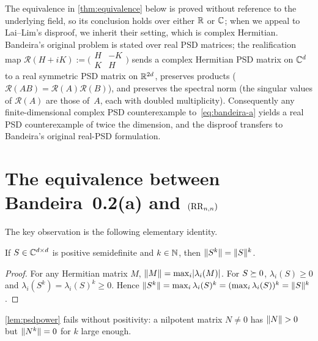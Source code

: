 \begin{remark}\label{rem:realification}
The equivalence in \cref{thm:equivalence} below is proved without
reference to the underlying field, so its conclusion holds over either
$\mathbb{R}$ or $\mathbb{C}$; when we appeal to Lai--Lim's disproof, we inherit their
setting, which is complex Hermitian.  Bandeira's original problem is
stated over real PSD matrices; the realification map
$\mathcal{R}(H+iK) :=
  \bigl(\begin{smallmatrix} H & -K \\ K & H \end{smallmatrix}\bigr)$
sends a complex Hermitian PSD matrix on $\mathbb{C}^d$ to a real symmetric
PSD matrix on $\mathbb{R}^{2d}$, preserves products
($\mathcal{R}(AB)=\mathcal{R}(A)\mathcal{R}(B)$), and preserves the
spectral norm (the singular values of $\mathcal{R}(A)$ are those
of~$A$, each with doubled multiplicity).  Consequently any finite-dimensional
complex PSD counterexample to~\eqref{eq:bandeira-a} yields a real PSD
counterexample of twice the dimension, and the disproof transfers to
Bandeira's original real-PSD formulation.
\end{remark}

\section{The equivalence between Bandeira~0.2(a) and $(\mathrm{RR}_{n,n})$}
\label{sec:equivalence}

The key observation is the following elementary identity.

\begin{lemma}\label{lem:psdpower}
If $S\in\mathbb{C}^{d\times d}$ is positive semidefinite and $k\in\mathbb{N}$, then
$\lVert S^{k}\rVert = \lVert S\rVert^{k}$.
\end{lemma}

\begin{proof}
For any Hermitian matrix $M$,
$\lVert M\rVert=\max_i \lvert\lambda_i(M)\rvert$.
For $S\succeq 0$, $\lambda_i(S)\ge 0$ and
$\lambda_i(S^{k})=\lambda_i(S)^{k}\ge 0$.  Hence
$\lVert S^{k}\rVert
 =\max_i \lambda_i(S)^{k}
 =(\max_i \lambda_i(S))^{k}
 =\lVert S\rVert^{k}$.
\end{proof}

\cref{lem:psdpower} fails without positivity: a nilpotent
matrix $N\ne 0$ has $\lVert N\rVert>0$ but $\lVert N^{k}\rVert=0$ for $k$
large enough.

